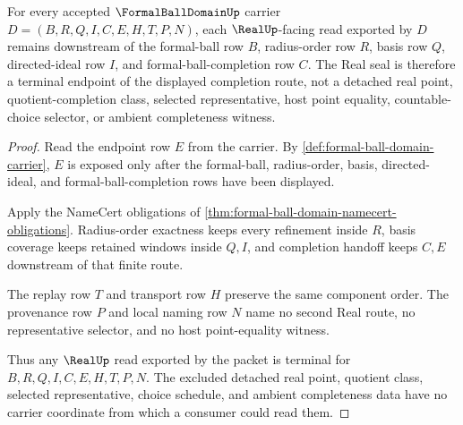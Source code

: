 \begin{theorem}\label{thm:formal-ball-domain-real-seal-boundary}
For every accepted $\FormalBallDomainUp$ carrier $D=(B,R,Q,I,C,E,H,T,P,N)$, each $\RealUp$-facing read exported by $D$ remains downstream of the formal-ball row $B$, radius-order row $R$, basis row $Q$, directed-ideal row $I$, and formal-ball-completion row $C$. The Real seal is therefore a terminal endpoint of the displayed completion route, not a detached real point, quotient-completion class, selected representative, host point equality, countable-choice selector, or ambient completeness witness.
\end{theorem}
\begin{proof}
Read the endpoint row $E$ from the carrier. By \autoref{def:formal-ball-domain-carrier}, $E$ is exposed only after the formal-ball, radius-order, basis, directed-ideal, and formal-ball-completion rows have been displayed.

Apply the NameCert obligations of \autoref{thm:formal-ball-domain-namecert-obligations}. Radius-order exactness keeps every refinement inside $R$, basis coverage keeps retained windows inside $Q,I$, and completion handoff keeps $C,E$ downstream of that finite route.

The replay row $T$ and transport row $H$ preserve the same component order. The provenance row $P$ and local naming row $N$ name no second Real route, no representative selector, and no host point-equality witness.

Thus any $\RealUp$ read exported by the packet is terminal for $B,R,Q,I,C,E,H,T,P,N$. The excluded detached real point, quotient class, selected representative, choice schedule, and ambient completeness data have no carrier coordinate from which a consumer could read them.
\end{proof}



